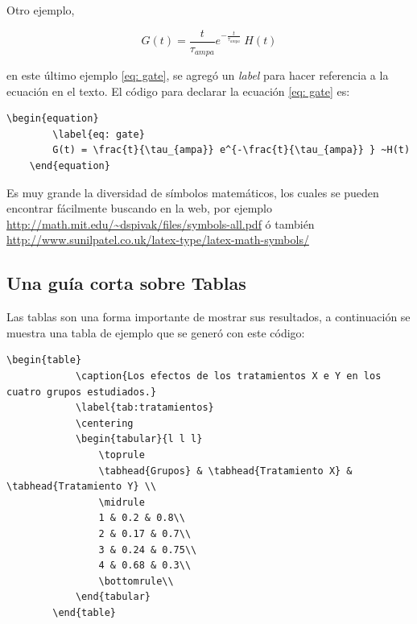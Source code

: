 Otro ejemplo, 

\begin{equation}
	\label{eq: gate}
	G(t) = \frac{t}{\tau_{ampa}} e^{-\frac{t}{\tau_{ampa}} } ~H(t)
\end{equation}

en este último ejemplo \ref{eq: gate}, se agregó un \emph{label}  para hacer referencia a la ecuación en el texto. El código para declarar la ecuación \ref{eq: gate} es: 

\begin{lstlisting}[basicstyle=\small,tabsize=4]
	\begin{equation}
		\label{eq: gate}
		G(t) = \frac{t}{\tau_{ampa}} e^{-\frac{t}{\tau_{ampa}} } ~H(t)
	\end{equation}
\end{lstlisting}
 

Es muy grande la diversidad de símbolos matemáticos, los cuales se pueden encontrar fácilmente buscando en la web, por ejemplo \url{http://math.mit.edu/~dspivak/files/symbols-all.pdf} ó también \url{http://www.sunilpatel.co.uk/latex-type/latex-math-symbols/}

\subsection{Una guía corta sobre Tablas}

Las tablas son una forma importante de mostrar sus resultados, a continuación se muestra una tabla de ejemplo que se generó con este código:

{\small
	\begin{lstlisting}[basicstyle=\small,tabsize=4]
		\begin{table}
			\caption{Los efectos de los tratamientos X e Y en los cuatro grupos estudiados.}
			\label{tab:tratamientos}
			\centering
			\begin{tabular}{l l l}
				\toprule
				\tabhead{Grupos} & \tabhead{Tratamiento X} & \tabhead{Tratamiento Y} \\
				\midrule
				1 & 0.2 & 0.8\\
				2 & 0.17 & 0.7\\
				3 & 0.24 & 0.75\\
				4 & 0.68 & 0.3\\
				\bottomrule\\
			\end{tabular}
		\end{table}
	\end{lstlisting}
}

